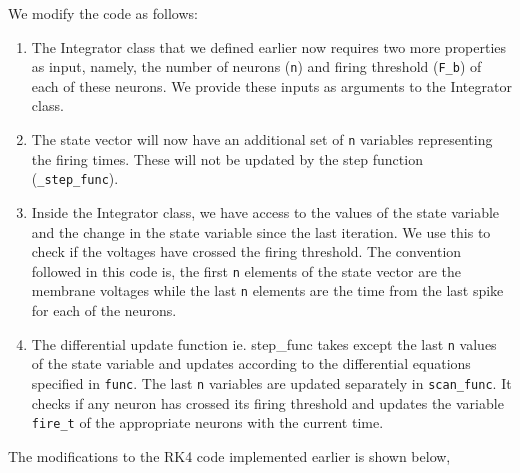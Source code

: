 \documentclass[10pt,letterpaper]{article}
\begin{document}
We modify the code as follows:
\begin{enumerate}
\item The Integrator class that we defined earlier now requires two more properties as input, namely, the number of neurons (\texttt{n}) and firing threshold (\texttt{F\_b}) of each of these neurons. We provide these inputs as arguments to the Integrator class.
\item The state vector will now have an additional set of \texttt{n} variables representing the firing times. These will not be updated by the step function (\texttt{\_step\_func}).
\item Inside the Integrator class, we have access to the values of the state variable and the change in the state variable since the last iteration. We use this to check if the voltages have crossed the firing threshold. The convention followed in this code is, the first \texttt{n} elements of the state vector are the membrane voltages while the last \texttt{n} elements are the time from the last spike for each of the neurons.
\item The differential update function ie. step\_func takes except the last \texttt{n} values of the state variable and updates according to the differential equations specified in \texttt{func}. The last \texttt{n} variables are updated separately in \texttt{scan\_func}. It checks if any neuron has crossed its firing threshold and updates the variable \texttt{fire\_t} of the appropriate neurons with the current time.
\end{enumerate}

The modifications to the RK4 code implemented earlier is shown below,
\end{document}
